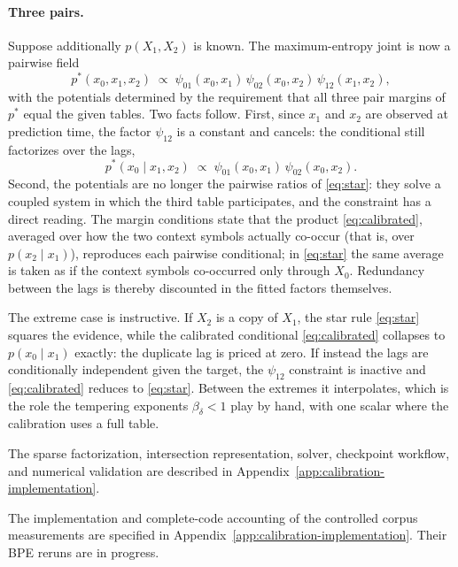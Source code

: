 \documentclass[11pt]{article}
\begin{document}
\paragraph{Three pairs.}  Suppose additionally $p(X_1, X_2)$ is
known.  The maximum-entropy joint is now a pairwise field
\begin{equation*}
  p^\ast(x_0, x_1, x_2)
  \;\propto\;
  \psi_{01}(x_0, x_1)\,\psi_{02}(x_0, x_2)\,\psi_{12}(x_1, x_2),
\end{equation*}
with the potentials determined by the requirement that all three pair
margins of $p^\ast$ equal the given tables.  Two facts follow.
First, since $x_1$ and $x_2$ are observed at prediction time, the
factor $\psi_{12}$ is a constant and cancels: the conditional still
factorizes over the lags,
\begin{equation}
\label{eq:calibrated}
  p^\ast(x_0 \mid x_1, x_2)
  \;\propto\;
  \psi_{01}(x_0, x_1)\,\psi_{02}(x_0, x_2).
\end{equation}
Second, the potentials are no longer the pairwise ratios of
\eqref{eq:star}: they solve a coupled system in which the third
table participates, and the constraint has a direct reading.  The
margin conditions state that the product \eqref{eq:calibrated},
averaged over how the two context symbols actually co-occur (that
is, over $p(x_2 \mid x_1)$), reproduces each pairwise conditional;
in \eqref{eq:star} the same average is taken as if the context
symbols co-occurred only through $X_0$.  Redundancy between the lags
is thereby discounted in the fitted factors themselves.

The extreme case is instructive.  If $X_2$ is a copy of $X_1$, the
star rule \eqref{eq:star} squares the evidence, while the calibrated
conditional \eqref{eq:calibrated} collapses to
$p(x_0 \mid x_1)$ exactly: the duplicate lag is priced at zero.  If
instead the lags are conditionally independent given the target, the
$\psi_{12}$ constraint is inactive and \eqref{eq:calibrated} reduces
to \eqref{eq:star}.  Between the extremes it interpolates, which is
the role the tempering exponents $\beta_\delta < 1$ play by hand,
with one scalar where the calibration uses a full table.

The sparse factorization, intersection representation, solver, checkpoint
workflow, and numerical validation are described in
Appendix~\ref{app:calibration-implementation}.

The implementation and complete-code accounting of the controlled corpus
measurements are specified in
Appendix~\ref{app:calibration-implementation}.  Their BPE reruns are in
progress.
\end{document}

